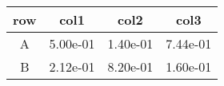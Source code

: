 \begin{tabular}{cccc}
\toprule
row&col1&col2&col3\tabularnewline
\midrule
A&5.00e-01&1.40e-01&7.44e-01\tabularnewline
B&2.12e-01&8.20e-01&1.60e-01\tabularnewline
\bottomrule
\end{tabular}
